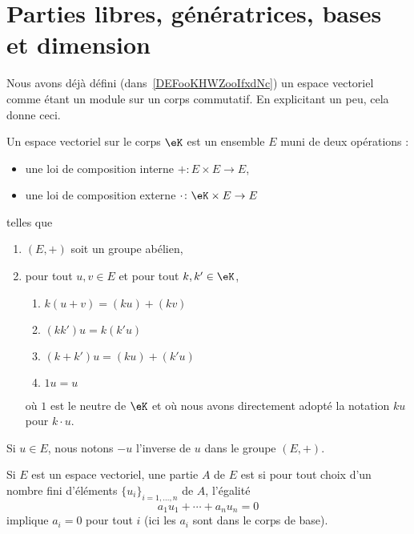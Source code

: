 
\section{Parties libres, génératrices, bases et dimension}

Nous avons déjà défini (dans~\ref{DEFooKHWZooIfxdNc}) un espace vectoriel comme étant un module sur un corps commutatif. En explicitant un peu, cela donne ceci\cite{ooQLVLooEUrNLS}.

Un espace vectoriel sur le corps \( \eK\) est un ensemble \( E\) muni de deux opérations :
\begin{itemize}
	\item une loi de composition interne \( +\colon E\times E\to E\),
	\item une loi de composition externe \( \cdot\colon \eK\times E\to E\)
\end{itemize}
telles que
\begin{enumerate}
	\item
	      \( (E,+)\) soit un groupe abélien,
	\item
	      pour tout \( u,v\in E\) et pour tout \( k,k'\in \eK\),
	      \begin{enumerate}
		      \item
		            \( k(u+v)=(ku)+(kv)\)
		      \item
		            \( (kk')u=k(k'u)\)
		      \item
		            \( (k+k')u=(ku)+(k'u)\)
		      \item
		            \( 1u=u\)
	      \end{enumerate}
	      où \( 1\) est le neutre de \( \eK\) et où nous avons directement adopté la notation \( ku\) pour \( k\cdot u\).
\end{enumerate}
Si \( u\in E\), nous notons \( -u\) l'inverse de \( u\) dans le groupe \( (E,+)\).

\begin{definition}		\label{DEFooDLHWooAvfhgc}
	Si \( E\) est un espace vectoriel, une partie \( A\) de \( E\) est  si pour tout choix d'un nombre fini d'éléments \( \{ u_i \}_{i=1,\ldots, n}\) de \( A\), l'égalité
	\begin{equation}
		a_1 u_1+\cdots +a_nu_n=0
	\end{equation}
	implique \( a_i=0\) pour tout \( i\) (ici les \( a_i\) sont dans le corps de base).
\end{definition}


